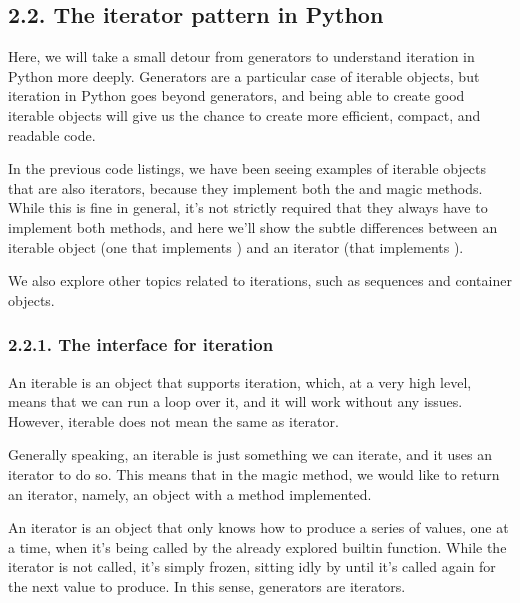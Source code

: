 \documentclass[a4paper,10pt,english]{sphinxmanual}
\begin{document}
\subsection{2.2. The iterator pattern in Python}
\label{\detokenize{chapters/7_generators/index:the-iterator-pattern-in-python}}
Here, we will take a small detour from generators to understand iteration in Python more
deeply. Generators are a particular case of iterable objects, but iteration in Python goes
beyond generators, and being able to create good iterable objects will give us the chance to
create more efficient, compact, and readable code.

In the previous code listings, we have been seeing examples of iterable objects that are
also iterators, because they implement both the  and  magic
methods. While this is fine in general, it’s not strictly required that they always have to
implement both methods, and here we’ll show the subtle differences between
an iterable object (one that implements ) and an iterator (that
implements ).

We also explore other topics related to iterations, such as sequences and container objects.


\subsubsection{2.2.1. The interface for iteration}
\label{\detokenize{chapters/7_generators/index:the-interface-for-iteration}}
An iterable is an object that supports iteration, which, at a very high level, means that we
can run a  loop over it, and it will work without any issues. However, iterable does not mean
the same as iterator.

Generally speaking, an iterable is just something we can iterate, and it uses an iterator to do
so. This means that in the  magic method, we would like to return an iterator,
namely, an object with a  method implemented.

An iterator is an object that only knows how to produce a series of values, one at a time,
when it’s being called by the already explored built\sphinxhyphen{}in  function. While the iterator
is not called, it’s simply frozen, sitting idly by until it’s called again for the next value to
produce. In this sense, generators are iterators.
\end{document}

